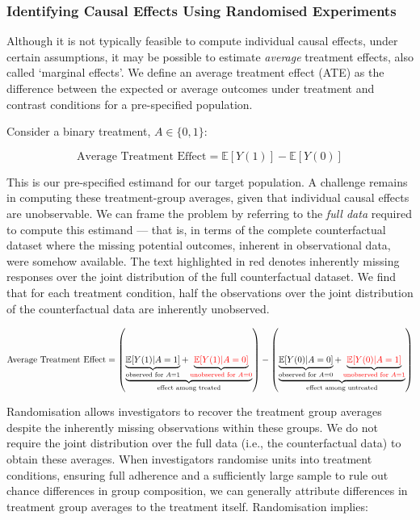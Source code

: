\documentclass[
  single column]{article}
\begin{document}
\subsubsection{Identifying Causal Effects Using Randomised
Experiments}\label{identifying-causal-effects-using-randomised-experiments}

Although it is not typically feasible to compute individual causal
effects, under certain assumptions, it may be possible to estimate
\emph{average} treatment effects, also called `marginal effects'. We
define an average treatment effect (ATE) as the difference between the
expected or average outcomes under treatment and contrast conditions for
a pre-specified population.

Consider a binary treatment, \(A \in \{0,1\}\):

\[
\text{Average Treatment Effect} = \mathbb{E}[Y(1)] - \mathbb{E}[Y(0)]
\]

This is our pre-specified estimand for our target population. A
challenge remains in computing these treatment-group averages, given
that individual causal effects are unobservable. We can frame the
problem by referring to the \emph{full data} required to compute this
estimand --- that is, in terms of the complete counterfactual dataset
where the missing potential outcomes, inherent in observational data,
were somehow available. The text highlighted in red denotes inherently
missing responses over the joint distribution of the full counterfactual
dataset. We find that for each treatment condition, half the
observations over the joint distribution of the counterfactual data are
inherently unobserved.

\[
\text{Average Treatment Effect} = \left(\underbrace{\underbrace{\mathbb{E}[Y(1)|A = 1]}_{\text{observed for } A = 1} + \underbrace{\textcolor{red}{\mathbb{E}[Y(1)|A = 0]}}_{\textcolor{red}{\text{unobserved for } A = 0}}}_{\text{effect among treated}}\right) - \left(\underbrace{\underbrace{\mathbb{E}[Y(0)|A = 0]}_{\text{observed for } A = 0} + \underbrace{\textcolor{red}{\mathbb{E}[Y(0)|A = 1]}}_{\textcolor{red}{\text{unobserved for } A = 1}}}_{\text{effect among untreated}}\right)
\]

Randomisation allows investigators to recover the treatment group
averages despite the inherently missing observations within these
groups. We do not require the joint distribution over the full data
(i.e., the counterfactual data) to obtain these averages. When
investigators randomise units into treatment conditions, ensuring full
adherence and a sufficiently large sample to rule out chance differences
in group composition, we can generally attribute differences in
treatment group averages to the treatment itself. Randomisation implies:
\end{document}
